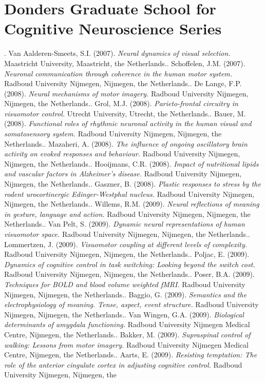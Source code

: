 \clearpage
\pagestyle{empty}

\chapter*{Donders Graduate School for Cognitive Neuroscience Series}
{}%

\npar\npar
\footnotesize
{}.	Van Aalderen-Smeets, S.I. (2007). \emph{Neural dynamics of visual selection.} Maastricht University, Maastricht, the Netherlands.\npar {}.	Schoffelen, J.M. (2007). \emph{Neuronal communication through coherence in the human motor system.} Radboud University Nijmegen, Nijmegen, the Netherlands.\npar {}.	De Lange, F.P. (2008). \emph{Neural mechanisms of motor imagery.} Radboud University Nijmegen, Nijmegen, the Netherlands.\npar {}.	Grol, M.J. (2008). \emph{Parieto-frontal circuitry in visuomotor control.} Utrecht University, Utrecht, the Netherlands.\npar {}.	Bauer, M. (2008). \emph{Functional roles of rhythmic neuronal activity in the human visual and somatosensory system.} Radboud University Nijmegen, Nijmegen, the Netherlands.\npar {}.	Mazaheri, A. (2008). \emph{The influence of ongoing oscillatory brain activity on evoked responses and behaviour.} Radboud University Nijmegen, Nijmegen, the Netherlands.\npar {}.	Hooijmans, C.R. (2008). \emph{Impact of nutritional lipids and vascular factors in Alzheimer's disease.} Radboud University Nijmegen, Nijmegen, the Netherlands.\npar {}.	Gaszner, B. (2008). \emph{Plastic responses to stress by the rodent urocortinergic Edinger-Westphal nucleus.} Radboud University Nijmegen, Nijmegen, the Netherlands.\npar {}.	Willems, R.M. (2009). \emph{Neural reflections of meaning in gesture, language and action.} Radboud University Nijmegen, Nijmegen, the Netherlands.\npar {}.	Van Pelt, S. (2009). \emph{Dynamic neural representations of human visuomotor space.} Radboud University Nijmegen, Nijmegen, the Netherlands.\npar {}.	Lommertzen, J. (2009). \emph{Visuomotor coupling at different levels of complexity.} Radboud University Nijmegen, Nijmegen, the Netherlands.\npar {}.	Poljac, E. (2009). \emph{Dynamics of cognitive control in task switching: Looking beyond the switch cost.} Radboud University Nijmegen, Nijmegen, the Netherlands.\npar {}.	Poser, B.A. (2009). \emph{Techniques for BOLD and blood volume weighted fMRI.} Radboud University Nijmegen, Nijmegen, the Netherlands.\npar {}.	Baggio, G. (2009). \emph{Semantics and the electrophysiology of meaning. Tense, aspect, event structure.} Radboud University Nijmegen, Nijmegen, the Netherlands.\npar {}.	Van Wingen, G.A. (2009). \emph{Biological determinants of amygdala functioning.} Radboud University Nijmegen Medical Centre, Nijmegen, the Netherlands.\npar {}.	Bakker, M. (2009). \emph{Supraspinal control of walking: Lessons from motor imagery.} Radboud University Nijmegen Medical Centre, Nijmegen, the Netherlands.\npar {}.	Aarts, E. (2009). \emph{Resisting temptation: The role of the anterior cingulate cortex in adjusting cognitive control.} Radboud University Nijmegen, Nijmegen, the 